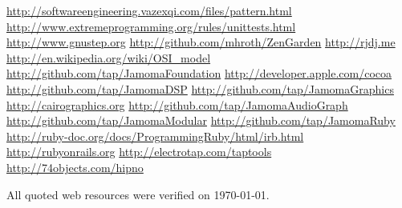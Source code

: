 \documentclass[twoside,10pt]{article}
\begin{document}











\renewcommand{\refname}{Web Resources}
\begin{thebibliography}{99}
	\footnotesize
{}    \url{http://softwareengineering.vazexqi.com/files/pattern.html}
    \url{http://www.extremeprogramming.org/rules/unittests.html}
    \url{http://www.gnustep.org} 
    \url{http://github.com/mhroth/ZenGarden}  
    \url{http://rjdj.me} 
    \url{http://en.wikipedia.org/wiki/OSI_model}
    \url{http://github.com/tap/JamomaFoundation}     
    \url{http://developer.apple.com/cocoa}    
 	  \url{http://github.com/tap/JamomaDSP}
  \url{http://github.com/tap/JamomaGraphics} 
  \url{http://cairographics.org}
  \url{http://github.com/tap/JamomaAudioGraph}
  \url{http://github.com/tap/JamomaModular}
  \url{http://github.com/tap/JamomaRuby}
  \url{http://ruby-doc.org/docs/ProgrammingRuby/html/irb.html}
  \url{http://rubyonrails.org}   
	\url{http://electrotap.com/taptools} 
	\url{http://74objects.com/hipno} 
\end{thebibliography} 
All quoted web resources were verified on \today.
\end{document}

